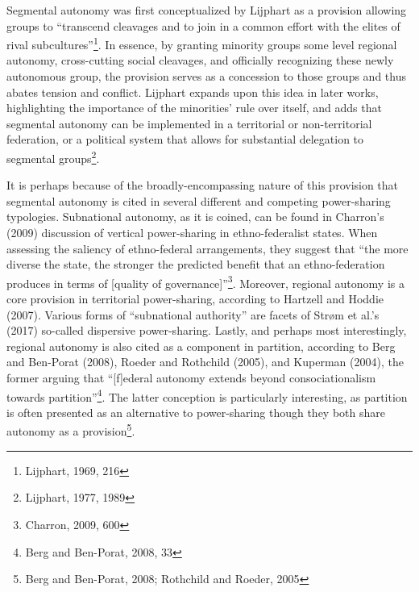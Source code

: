 \documentclass[12pt]{article}
\begin{document}
Segmental autonomy was first conceptualized by Lijphart as a provision allowing groups to ``transcend cleavages and to join in a common effort with the elites of rival subcultures''\footnote{Lijphart, 1969, 216}. In essence, by granting minority groups some level regional autonomy, cross-cutting social cleavages, and officially recognizing these newly autonomous group, the provision serves as a concession to those groups and thus abates tension and conflict. Lijphart expands upon this idea in later works, highlighting the importance of the minorities’ rule over itself, and adds that segmental autonomy can be implemented in a territorial or non-territorial federation, or a political system that allows for substantial delegation to segmental groups\footnote{Lijphart, 1977, 1989}. 

It is perhaps because of the broadly-encompassing nature of this provision that segmental autonomy is cited in several different and competing power-sharing typologies. Subnational autonomy, as it is coined, can be found in Charron’s (2009) discussion of vertical power-sharing in ethno-federalist states. When assessing the saliency of ethno-federal arrangements, they suggest that ``the more diverse the state, the stronger the predicted benefit that an ethno-federation produces in terms of [quality of governance]''\footnote{Charron, 2009, 600}. Moreover, regional autonomy is a core provision in territorial power-sharing, according to Hartzell and Hoddie (2007). Various forms of ``subnational authority'' are facets of Strøm et al.’s (2017) so-called dispersive power-sharing. Lastly, and perhaps most interestingly, regional autonomy is also cited as a component in partition, according to Berg and Ben-Porat (2008), Roeder and Rothchild (2005), and Kuperman (2004), the former arguing that ``[f]ederal autonomy extends beyond consociationalism towards partition''\footnote{Berg and Ben-Porat, 2008, 33}. The latter conception is particularly interesting, as partition is often presented as an alternative to power-sharing though they both share autonomy as a provision\footnote{Berg and Ben-Porat, 2008; Rothchild and Roeder, 2005}. 
\end{document}
